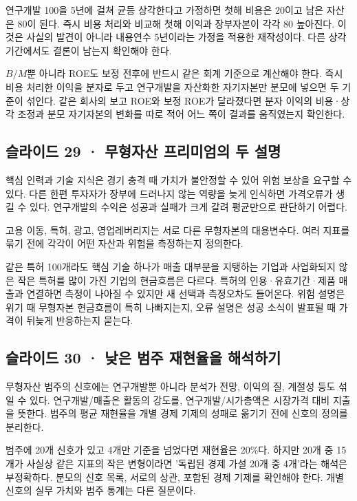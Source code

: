 \documentclass[11pt,a4paper]{article}
\begin{document}
연구개발 100을 5년에 걸쳐 균등 상각한다고 가정하면 첫해 비용은 20이고 남은 자산은 80이 된다. 즉시 비용 처리와 비교해 첫해 이익과 장부자본이 각각 80 높아진다. 이것은 사실의 발견이 아니라 내용연수 5년이라는 가정을 적용한 재작성이다. 다른 상각기간에서도 결론이 남는지 확인해야 한다.\par

$B/M$뿐 아니라 ROE도 보정 전후에 반드시 같은 회계 기준으로 계산해야 한다. 즉시 비용 처리한 이익을 분자로 두고 연구개발을 자산화한 자기자본만 분모에 넣으면 두 기준이 섞인다. 같은 회사의 보고 ROE와 보정 ROE가 달라졌다면 분자 이익의 비용·상각 조정과 분모 자기자본의 변화를 따로 적어 어느 쪽이 결과를 움직였는지 확인한다.\par

\subsection{슬라이드 29 · 무형자산 프리미엄의 두 설명}
핵심 인력과 기술 지식은 경기 충격 때 가치가 불안정할 수 있어 위험 보상을 요구할 수 있다. 다른 한편 투자자가 장부에 드러나지 않는 역량을 늦게 인식하면 가격오류가 생길 수 있다. 연구개발의 수익은 성공과 실패가 크게 갈려 평균만으로 판단하기 어렵다.\par

고용 이동, 특허, 광고, 영업레버리지는 서로 다른 무형자본의 대용변수다. 여러 지표를 묶기 전에 각각이 어떤 자산과 위험을 측정하는지 정의한다.\par

같은 특허 100개라도 핵심 기술 하나가 매출 대부분을 지탱하는 기업과 사업화되지 않은 작은 특허를 많이 가진 기업의 현금흐름은 다르다. 특허의 인용·유효기간·제품 매출과 연결하면 측정이 나아질 수 있지만 새 선택과 측정오차도 들어온다. 위험 설명은 위기 때 무형자본 현금흐름이 특히 나빠지는지, 오류 설명은 성공 소식이 발표될 때 가격이 뒤늦게 반응하는지 묻는다.\par

\subsection{슬라이드 30 · 낮은 범주 재현율을 해석하기}
무형자산 범주의 신호에는 연구개발뿐 아니라 분석가 전망, 이익의 질, 계절성 등도 섞일 수 있다. 연구개발/매출은 활동의 강도를, 연구개발/시가총액은 시장가격 대비 지출을 뜻한다. 범주의 평균 재현율을 개별 경제 기제의 성패로 옮기기 전에 신호의 정의를 분리한다.\par

범주에 20개 신호가 있고 4개만 기준을 넘었다면 재현율은 20\%다. 하지만 20개 중 15개가 사실상 같은 지표의 작은 변형이라면 '독립된 경제 가설 20개 중 4개'라는 해석은 부정확하다. 분모의 신호 목록, 서로의 상관, 포함된 경제 기제를 확인해야 한다. 개별 신호의 실무 가치와 범주 통계는 다른 질문이다.\par
\end{document}

